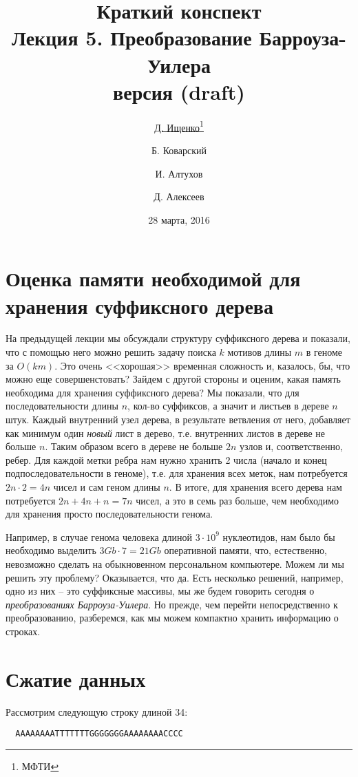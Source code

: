 \documentclass[letterpaper, 11pt]{article}
\title{\large{Краткий конспект}\\
\LARGE{Лекция 5. Преобразование Барроуза-Уилера}\\
\normalsize версия \versionnumber (\textcolor{NavyBlue}{draft})}
\date{28 марта, 2016}
\author{\underline{Д. Ищенко\thanks{МФТИ}} \and Б. Коварский\footnotemark[1]
\and И. Алтухов\footnotemark[1] \and Д. Алексеев\footnotemark[1]}
\begin{document}
\maketitle
\thispagestyle{empty}
\clearpage

\section{Оценка памяти необходимой для хранения суффиксного дерева}

На предыдущей лекции мы обсуждали структуру суффиксного дерева и показали, что с помощью него можно решить задачу поиска $k$ мотивов длины $m$ в геноме за $O(km)$. Это очень <<хорошая>> временная сложность и, казалось, бы, что можно еще совершенстовать? Зайдем с другой стороны и оценим, какая память необходима для хранения суффиксного дерева? Мы показали, что для последовательности длины $n$, кол-во суффиксов, а значит и листьев в дереве $n$ штук. Каждый внутренний узел дерева, в результате ветвления от него, добавляет как минимум один \textit{новый} лист в дерево, т.е. внутренних листов в дереве не больше $n$. Таким образом всего в дереве не больше $2n$ узлов и, соответственно, ребер. Для каждой метки ребра нам нужно хранить 2 числа (начало и конец подпоследовательности в геноме), т.е. для хранения всех меток, нам потребуется $2n \cdot 2 = 4n$ чисел и сам геном длины $n$. В итоге, для хранения всего дерева нам потребуется $2n + 4n + n = 7n$ чисел, а это в семь раз больше, чем необходимо для хранения просто последовательности генома.

Например, в случае генома человека длиной $3\cdot10^9$ нуклеотидов, нам было бы необходимо выделить $3Gb \cdot 7 = 21Gb$ оперативной памяти, что, естественно, невозможно сделать на обыкновенном персональном компьютере. Можем ли мы решить эту проблему? Оказывается, что да. Есть несколько решений, например, одно из них -- это суффиксные массивы, мы же будем говорить сегодня о \textit{преобразованиях Барроуза-Уилера}. Но прежде, чем перейти непосредственно к преобразованию, разберемся, как мы можем компактно хранить информацию о строках.

\section{Сжатие данных}

Рассмотрим следующую строку длиной 34:
\begin{verbatim}
  AAAAAAAATTTTTTTGGGGGGGAAAAAAAACCCC
\end{verbatim}
\end{document}
